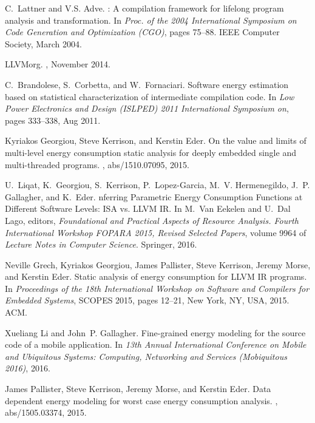 \documentclass[oneside]{book}
\begin{document}
\begin{thebibliography}{10}
C.~Lattner and V.S. Adve.
: A compilation framework for lifelong program analysis and
  transformation.
\newblock In {\em Proc. of the 2004 International Symposium on Code Generation
  and Optimization (CGO)}, pages 75--88. IEEE Computer Society, March 2004.

{LLVMorg}.
, November 2014.

C.~Brandolese, S.~Corbetta, and W.~Fornaciari.
\newblock Software energy estimation based on statistical characterization of
  intermediate compilation code.
\newblock In {\em Low Power Electronics and Design (ISLPED) 2011 International
  Symposium on}, pages 333--338, Aug 2011.

Kyriakos Georgiou, Steve Kerrison, and Kerstin Eder.
\newblock On the value and limits of multi-level energy consumption static
  analysis for deeply embedded single and multi-threaded programs.
, abs/1510.07095, 2015.

U.~Liqat, K.~Georgiou, S.~Kerrison, P.~Lopez-Garcia, M.~V. Hermenegildo, J.~P.
  Gallagher, and K.~Eder.
nferring {P}arametric {E}nergy {C}onsumption {F}unctions at
  {D}ifferent {S}oftware {L}evels: {ISA} vs. {LLVM IR}.
\newblock In M.~Van Eekelen and U.~Dal Lago, editors, {\em Foundational and
  Practical Aspects of Resource Analysis. Fourth International Workshop FOPARA
  2015, Revised Selected Papers}, volume 9964 of {\em Lecture Notes in Computer
  Science}. Springer, 2016.

Neville Grech, Kyriakos Georgiou, James Pallister, Steve Kerrison, Jeremy
  Morse, and Kerstin Eder.
\newblock Static analysis of energy consumption for {LLVM IR} programs.
\newblock In {\em Proceedings of the 18th International Workshop on Software
  and Compilers for Embedded Systems}, SCOPES 2015, pages 12--21, New York, NY,
  USA, 2015. ACM.

Xueliang Li and John~P. Gallagher.
\newblock Fine-grained energy modeling for the source code of a mobile
  application.
\newblock In {\em 13th Annual International Conference on Mobile and Ubiquitous
  Systems: Computing, Networking and Services (Mobiquitous 2016)}, 2016.

James Pallister, Steve Kerrison, Jeremy Morse, and Kerstin Eder.
\newblock Data dependent energy modeling for worst case energy consumption
  analysis.
, abs/1505.03374, 2015.


\end{thebibliography}
\end{document}
